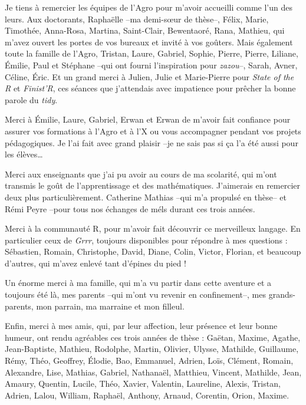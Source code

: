 \documentclass[12pt,a4paper]{reedthesis}
\theoremstyle{definition}
\theoremstyle{definition}
\theoremstyle{definition}
\theoremstyle{remark}
\begin{document}
\begin{acknowledgements}
    Je tiens à remercier les équipes de l'Agro pour m'avoir accueilli comme l'un des leurs. Aux doctorants, Raphaëlle --ma demi-sœur de thèse--, Félix, Marie, Timothée, Anna-Rosa, Martina, Saint-Clair, Bewentaoré, Rana, Mathieu, qui m'avez ouvert les portes de vos bureaux et invité à vos goûters. Mais également toute la famille de l'Agro, Tristan, Laure, Gabriel, Sophie, Pierre, Pierre, Liliane, Émilie, Paul et Stéphane --qui ont fourni l'inspiration pour \emph{zazou}--, Sarah, Avner, Céline, Éric. Et un grand merci à Julien, Julie et Marie-Pierre pour \emph{State of the R} et \emph{Finist'R}, ces séances que j'attendais avec impatience pour prêcher la bonne parole du \emph{tidy}.
    
    \vspace{5mm}
    
    Merci à Émilie, Laure, Gabriel, Erwan et Erwan de m'avoir fait confiance pour assurer vos formations à l'Agro et à l'X ou vous accompagner pendant vos projets pédagogiques. Je l'ai fait avec grand plaisir --je ne sais pas si ça l'a été aussi pour les élèves\ldots{}
    
    \vspace{5mm}
    
    Merci aux enseignants que j'ai pu avoir au cours de ma scolarité, qui m'ont transmis le goût de l'apprentissage et des mathématiques. J'aimerais en remercier deux plus particulièrement. Catherine Mathias --qui m'a propulsé en thèse-- et Rémi Peyre --pour tous nos échanges de méls durant ces trois années.
    
    \vspace{5mm}
    
    Merci à la communauté R, pour m'avoir fait découvrir ce merveilleux langage. En particulier ceux de \emph{Grrr}, toujours disponibles pour répondre à mes questions : Sébastien, Romain, Christophe, David, Diane, Colin, Victor, Florian, et beaucoup d'autres, qui m'avez enlevé tant d'épines du pied !
    
    \vspace{5mm}
    
    Un énorme merci à ma famille, qui m'a vu partir dans cette aventure et a toujours été là, mes parents --qui m'ont vu revenir en confinement--, mes grands-parents, mon parrain, ma marraine et mon filleul.
    
    \vspace{5mm}
    
    Enfin, merci à mes amis, qui, par leur affection, leur présence et leur bonne humeur, ont rendu agréables ces trois années de thèse : Gaëtan, Maxime, Agathe, Jean-Baptiste, Mathieu, Rodolphe, Martin, Olivier, Ulysse, Mathilde, Guillaume, Rémy, Théo, Geoffrey, Élodie, Bao, Emmanuel, Adrien, Loïs, Clément, Romain, Alexandre, Lise, Mathias, Gabriel, Nathanaël, Matthieu, Vincent, Mathilde, Jean, Amaury, Quentin, Lucile, Théo, Xavier, Valentin, Laureline, Alexis, Tristan, Adrien, Lalou, William, Raphaël, Anthony, Arnaud, Corentin, Orion, Maxime.
  \end{acknowledgements}
\end{document}
